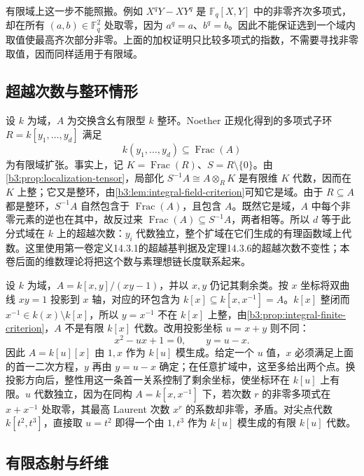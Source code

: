 \ProseParagraphBreak
有限域上这一步不能照搬。例如 \(X^qY-XY^q\) 是 \(\mathbb F_q[X,Y]\) 中的非零齐次多项式，却在所有 \((a,b)\in\mathbb F_q^2\) 处取零，因为 \(a^q=a\)、\(b^q=b\)。因此不能保证选到一个域内取值使最高齐次部分非零。上面的加权证明只比较多项式的指数，不需要寻找非零取值，因而同样适用于有限域。

\subsection{超越次数与整环情形}\label{b3:subsec:0504:03}

设 \(k\) 为域，\(A\) 为交换含幺有限型 \(k\) 整环。Noether 正规化得到的多项式子环 \(R=k[y_1,\ldots,y_d]\) 满足
\[
	k(y_1,\ldots,y_d)\subseteq\operatorname{Frac}(A)
\]
为有限域扩张。事实上，记 \(K=\operatorname{Frac}(R)\)、\(S=R\setminus\{0\}\)。由\cref{b3:prop:localization-tensor}，局部化 \(S^{-1}A\cong A\otimes_RK\) 是有限维 \(K\) 代数，因而在 \(K\) 上整；它又是整环，由\cref{b3:lem:integral-field-criterion}可知它是域。由于 \(R\subseteq A\) 都是整环，\(S^{-1}A\) 自然包含于 \(\operatorname{Frac}(A)\)，且包含 \(A\)。既然它是域，\(A\) 中每个非零元素的逆也在其中，故反过来 \(\operatorname{Frac}(A)\subseteq S^{-1}A\)，两者相等。所以 \(d\) 等于此分式域在 \(k\) 上的超越次数：\(y_i\) 代数独立，整个扩域在它们生成的有理函数域上代数。这里使用第一卷定义14.3.1的超越基判据及定理14.3.6的超越次数不变性；本卷后面的维数理论将把这个数与素理想链长度联系起来。

\begin{example}\label{b3:exm:noether-normalization-curves}
	设 \(k\) 为域，\(A=k[x,y]/(xy-1)\)，并以 \(x,y\) 仍记其剩余类。按 \(x\) 坐标将双曲线 \(xy=1\) 投影到 \(x\) 轴，对应的环包含为 \(k[x]\subseteq k[x,x^{-1}]=A\)。\(k[x]\) 整闭而 \(x^{-1}\in k(x)\setminus k[x]\)，所以 \(y=x^{-1}\) 不在 \(k[x]\) 上整，由\cref{b3:prop:integral-finite-criterion}，\(A\) 不是有限 \(k[x]\) 代数。改用投影坐标 \(u=x+y\) 则不同：
	\[
		x^2-ux+1=0,\qquad y=u-x.
	\]
	因此 \(A=k[u][x]\) 由 \(1,x\) 作为 \(k[u]\) 模生成。给定一个 \(u\) 值，\(x\) 必须满足上面的首一二次方程，\(y\) 再由 \(y=u-x\) 确定；在任意扩域中，这至多给出两个点。换投影方向后，整性用这一条首一关系控制了剩余坐标，使坐标环在 \(k[u]\) 上有限。\(u\) 代数独立，因为在同构 \(A=k[x,x^{-1}]\) 下，若次数 \(r\) 的非零多项式在 \(x+x^{-1}\) 处取零，其最高 Laurent 次数 \(x^r\) 的系数却非零，矛盾。对尖点代数 \(k[t^2,t^3]\)，直接取 \(u=t^2\) 即得一个由 \(1,t^3\) 作为 \(k[u]\) 模生成的有限 \(k[u]\) 代数。
\end{example}

\subsection{有限态射与纤维}\label{b3:subsec:0504:04}

